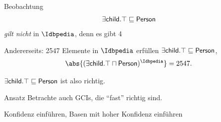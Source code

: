\documentclass[ngerman]{beamer}
\begin{document}
\begin{frame}
  

  \begin{block}{Beobachtung}
    \begin{equation*}
      \sf \exists child. \top \sqsubseteq Person
    \end{equation*}
    \emph{gilt nicht} in $\Idbpedia$, denn es gibt 4 
    \begin{overlayarea}{\textwidth}{5ex}
    \end{overlayarea}


    \bigskip{}

    Andererseits: 2547 Elemente in $\Idbpedia$ erfüllen $\sf \exists child. \top
    \sqsubseteq \sf Person$, \dh
    \begin{equation*}
      \abs{ (\sf \exists child.\top \sqcap Person)^{\Idbpedia} } = 2547.
    \end{equation*}


    $\sf \exists child. \top \sqsubseteq Person$ ist also
     richtig.
  \end{block}

\end{frame}

\begin{frame}

  \onslide<+->

  \begin{block}{Ansatz}
    Betrachte auch GCIs, die \enquote{fast} richtig sind.
  \end{block}

  \onslide<+->

  Konfidenz einführen, Basen mit hoher Konfidenz einführen
\end{frame}
\end{document}
